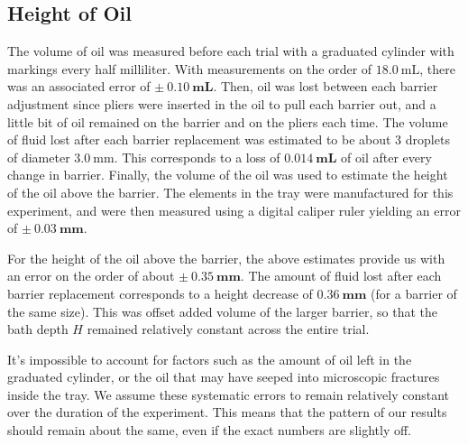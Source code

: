     \subsection{Height of Oil}
The volume of oil was measured before each trial with a graduated cylinder with markings every half milliliter. With measurements on the order of $18.0~\mathrm{mL}$, there was an associated error of $\mathbf{\pm~0.10~\mathrm{\textbf{mL}}}$. Then, oil was lost between each barrier adjustment since pliers were inserted in the oil to pull each barrier out, and a little bit of oil remained on the barrier and on the pliers each time. The volume of fluid lost after each barrier replacement was estimated to be about 3 droplets of diameter $3.0~\mathrm{mm}$. This corresponds to a loss of $\mathbf{0.014~\mathrm{\textbf{mL}}}$ of oil after every change in barrier. Finally, the volume of the oil was used to estimate the height of the oil above the barrier. The elements in the tray were manufactured for this experiment, and were then measured using a digital caliper ruler yielding an error of $\mathbf{\pm~0.03~\mathrm{\textbf{mm}}}$. 

For the height of the oil above the barrier, the above estimates provide us with an error on the order of about $\mathbf{\pm~0.35~\mathrm{\textbf{mm}}}$. The amount of fluid lost after each barrier replacement corresponds to a height decrease of $\mathbf{0.36~\mathrm{\textbf{mm}}}$ (for a barrier of the same size). This was offset added volume of the larger barrier, so that the bath depth $H$ remained relatively constant across the entire trial. 

It's impossible to account for factors such as the amount of oil left in the graduated cylinder, or the oil that may have seeped into microscopic fractures inside the tray. We assume these systematic errors to remain relatively constant over the duration of the experiment. This means that the pattern of our results should remain about the same, even if the exact numbers are slightly off. 

